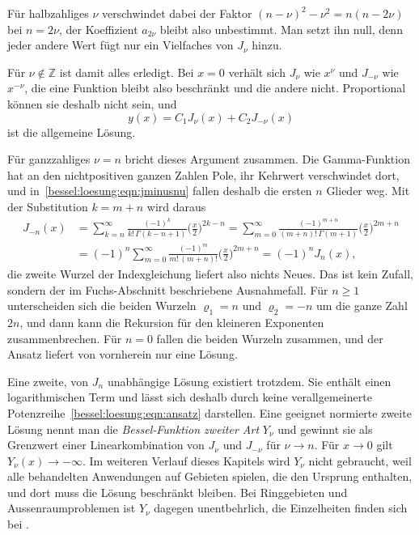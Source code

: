 Für halbzahliges $\nu$ verschwindet dabei der Faktor $(n-\nu)^2-\nu^2=n(n-2\nu)$ bei $n=2\nu$, der Koeffizient $a_{2\nu}$ bleibt also unbestimmt.
Man setzt ihn null, denn jeder andere Wert fügt nur ein Vielfaches von $J_\nu$ hinzu.

Für $\nu\notin\mathbb{Z}$ ist damit alles erledigt.
Bei $x=0$ verhält sich $J_\nu$ wie $x^{\nu}$ und $J_{-\nu}$ wie $x^{-\nu}$, die eine Funktion bleibt also beschränkt und die andere nicht.
Proportional können sie deshalb nicht sein, und
\[
y(x)
=
C_1 J_\nu(x) + C_2 J_{-\nu}(x)
\]
ist die allgemeine Lösung.

Für ganzzahliges $\nu=n$ bricht dieses Argument zusammen.
Die Gamma-Funktion hat an den nichtpositiven ganzen Zahlen Pole, ihr Kehrwert verschwindet dort, und in~\eqref{bessel:loesung:eqn:jminusnu} fallen deshalb die ersten $n$ Glieder weg.
Mit der Substitution $k=m+n$ wird daraus
\begin{align*}
J_{-n}(x)
&=
\sum_{k=n}^\infty
\frac{(-1)^k}{k!\,\Gamma(k-n+1)}
\biggl(\frac{x}{2}\biggr)^{2k-n}
=
\sum_{m=0}^\infty
\frac{(-1)^{m+n}}{(m+n)!\,\Gamma(m+1)}
\biggl(\frac{x}{2}\biggr)^{2m+n}
\\
&=
(-1)^n
\sum_{m=0}^\infty
\frac{(-1)^m}{m!\,(m+n)!}
\biggl(\frac{x}{2}\biggr)^{2m+n}
=
(-1)^n J_n(x),
\end{align*}
die zweite Wurzel der Indexgleichung liefert also nichts Neues.
Das ist kein Zufall, sondern der im Fuchs-Abschnitt beschriebene Ausnahmefall.
Für $n\ge 1$ unterscheiden sich die beiden Wurzeln $\varrho_1=n$ und $\varrho_2=-n$ um die ganze Zahl $2n$, und dann kann die Rekursion für den kleineren Exponenten zusammenbrechen.
Für $n=0$ fallen die beiden Wurzeln zusammen, und der Ansatz liefert von vornherein nur eine Lösung.

Eine zweite, von $J_n$ unabhängige Lösung existiert trotzdem.
Sie enthält einen logarithmischen Term und lässt sich deshalb durch keine verallgemeinerte Potenzreihe~\eqref{bessel:loesung:eqn:ansatz} darstellen.
Eine geeignet normierte zweite Lösung nennt man die \emph{Bessel-Funktion zweiter Art} $Y_\nu$
%
und gewinnt sie als Grenzwert einer Linearkombination von $J_\nu$ und $J_{-\nu}$ für $\nu\to n$.
Für $x\to 0$ gilt $Y_\nu(x)\to-\infty$.
Im weiteren Verlauf dieses Kapitels wird $Y_\nu$ nicht gebraucht, weil alle behandelten Anwendungen auf Gebieten spielen, die den Ursprung enthalten, und dort muss die Lösung beschränkt bleiben.
Bei Ringgebieten und Aussenraumproblemen ist $Y_\nu$ dagegen unentbehrlich, die Einzelheiten finden sich bei \cite{bessel:watson}.
